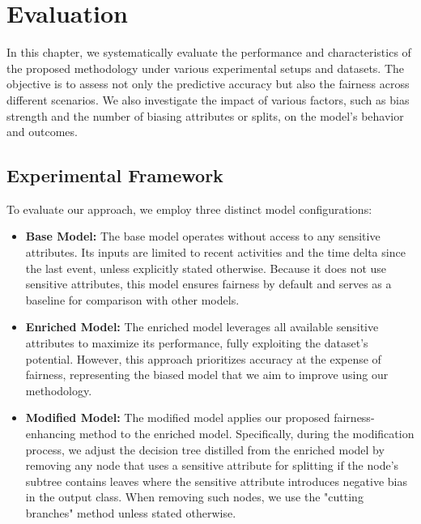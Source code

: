 %
\chapter{Evaluation}
In this chapter, we systematically evaluate the performance and characteristics of the proposed methodology
under various experimental setups and datasets.
The objective is to assess not only the predictive accuracy but also the fairness across different scenarios.
We also investigate the impact of various factors,
such as bias strength and the number of biasing attributes or splits,
on the model's behavior and outcomes.

\section{Experimental Framework}
To evaluate our approach, we employ three distinct model configurations:
\begin{itemize}
    \item \textbf{Base Model:}
        The base model operates without access to any sensitive attributes.
        Its inputs are limited to recent activities and the time delta since the last event,
        unless explicitly stated otherwise.
        Because it does not use sensitive attributes,
        this model ensures fairness by default and serves as a baseline for comparison with other models.
    \item \textbf{Enriched Model:}
        The enriched model leverages all available sensitive attributes to maximize its performance,
        fully exploiting the dataset's potential.
        However, this approach prioritizes accuracy at the expense of fairness,
        representing the biased model that we aim to improve using our methodology.
    \item \textbf{Modified Model:}
        The modified model applies our proposed fairness-enhancing method to the enriched model.
        Specifically, during the modification process,
        we adjust the decision tree distilled from the enriched model by removing any node
        that uses a sensitive attribute for splitting if the node's subtree contains leaves
        where the sensitive attribute introduces negative bias in the output class.
        When removing such nodes, we use the "cutting branches" method unless stated otherwise.
\end{itemize}

